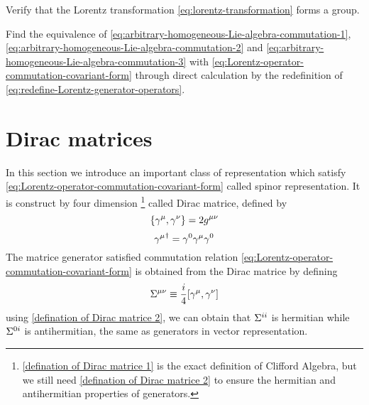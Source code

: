 \begin{Exe}
  Verify that the Lorentz transformation \eqref{eq:lorentz-transformation} forms a group.
\end{Exe}

\begin{Exe}
  Find the equivalence of \eqref{eq:arbitrary-homogeneous-Lie-algebra-commutation-1}, \eqref{eq:arbitrary-homogeneous-Lie-algebra-commutation-2} and \eqref{eq:arbitrary-homogeneous-Lie-algebra-commutation-3} with \eqref{eq:Lorentz-operator-commutation-covariant-form} through direct calculation by the redefinition of \eqref{eq:redefine-Lorentz-generator-operators}.
\end{Exe}

\section{Dirac matrices}

In this section we introduce an important class of representation which satisfy
\eqref{eq:Lorentz-operator-commutation-covariant-form} called spinor representation.
It is construct by four dimension 
\footnote{\eqref{defination of Dirac matrice 1} is the exact definition of Clifford Algebra, but we still need \eqref{defination of Dirac matrice 2} to ensure the hermitian and antihermitian properties of generators. } called Dirac matrice, defined by
\begin{equation} \label{defination of Dirac matrice 1}
\acomm{\g^{\m}}{\g^{\n}} = 2g^{\mu\nu}
\end{equation}
\begin{equation} \label{defination of Dirac matrice 2}
{\gamma^{\mu}}^{\dagger} = \gamma^0\gamma^{\mu}\gamma^0
\end{equation}
The matrice generator satisfied commutation relation \eqref{eq:Lorentz-operator-commutation-covariant-form} is obtained from the Dirac matrice by defining
\begin{equation} \label{definition of generators in Dirac representation}
\Si^{\mu\nu}\equiv \frac{i}{4}\comm{\g^{\m}}{\g^{\n}}
\end{equation}
using \eqref{defination of Dirac matrice 2}, we can obtain that $\Sigma^{ii}$ is hermitian while $\Sigma^{0i}$ is antihermitian, the same as generators in vector representation.

